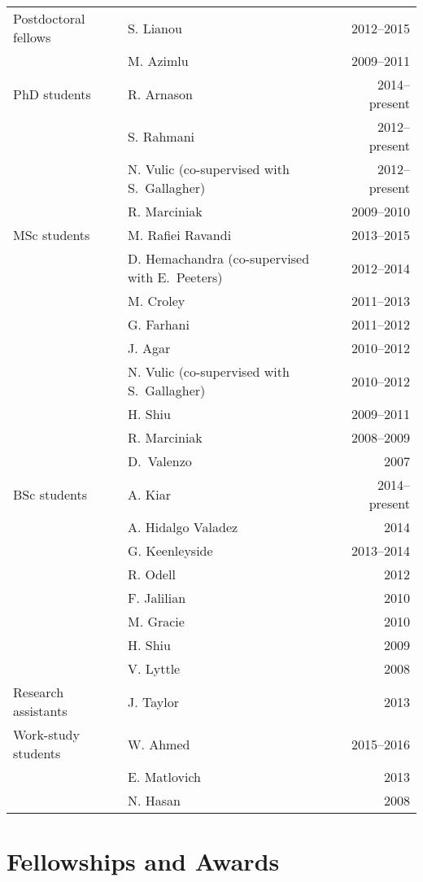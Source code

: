\documentclass[12pt]{article}
\begin{document}
\begin{tabularx}{\textwidth}{p{5cm}Xr}
Postdoctoral fellows 
& S. Lianou & 2012--2015\\
& M. Azimlu & 2009--2011\\
PhD students 
&  R. Arnason & 2014--present\\
&S. Rahmani& 2012--present \\
&N. Vulic (co-supervised with S.\ Gallagher) & 2012--present \\
&R. Marciniak & 2009--2010 \\
MSc students 
& M. Rafiei Ravandi& 2013--2015\\
& D. Hemachandra (co-supervised with E.\ Peeters)& 2012--2014\\
& M. Croley& 2011--2013\\
& G. Farhani& 2011--2012\\
 & J. Agar& 2010--2012\\
& N. Vulic (co-supervised with S.\ Gallagher)& 2010--2012\\
& H. Shiu& 2009--2011\\
& R. Marciniak& 2008--2009\\
& D.\ Valenzo& 2007\\
BSc students
& A. Kiar & 2014--present\\
& A. Hidalgo Valadez & 2014\\
& G. Keenleyside& 2013--2014\\
& R. Odell& 2012\\
& F. Jalilian& 2010\\
& M. Gracie& 2010\\
& H. Shiu& 2009\\
& V. Lyttle& 2008\\
Research assistants 
& J. Taylor& 2013\\
Work-study students
& W. Ahmed & 2015--2016\\
& E. Matlovich& 2013\\
& N. Hasan& 2008\\
\end{tabularx}

\section{Fellowships and Awards}
\end{document}
